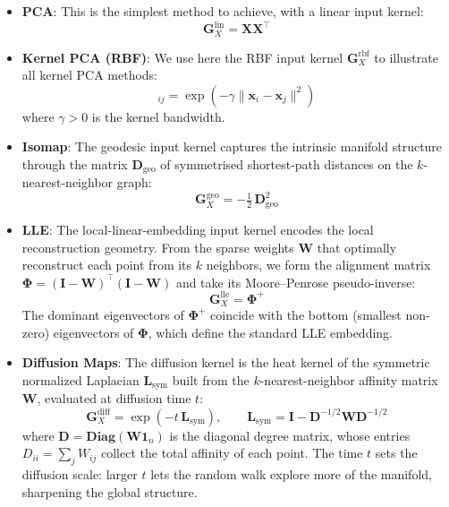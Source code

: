 \documentclass[11pt]{article}
\begin{document}
	\begin{itemize}
		\item \textbf{PCA}: This is the simplest method to achieve, with a linear input kernel:
		\begin{equation}
			\mathbf{G}^\text{lin}_X = \mathbf{X}\mathbf{X}^\top
		\end{equation}
		
		\item \textbf{Kernel PCA (RBF)}: We use here the RBF input kernel $\mathbf{G}^\text{rbf}_X$ to illustrate all kernel PCA methods:
		\begin{equation}
			[\mathbf{G}^\text{rbf}_X]_{ij}=\exp(-\gamma\|\mathbf{x}_i-\mathbf{x}_j\|^2)
		\end{equation}
		where $\gamma>0$ is the kernel bandwidth.
		
		\item \textbf{Isomap}: The geodesic input kernel captures the intrinsic manifold structure through the matrix $\mathbf{D}_\text{geo}$ of symmetrised shortest-path distances on the $k$-nearest-neighbor graph:
		\begin{equation}
			\mathbf{G}^\text{geo}_X = -\tfrac{1}{2}\,\mathbf{D}^2_\text{geo}
		\end{equation}
		
		\item \textbf{LLE}: The local-linear-embedding input kernel encodes the local reconstruction geometry. From the sparse weights $\mathbf{W}$ that optimally reconstruct each point from its $k$ neighbors, we form the alignment matrix $\bm{\Phi}=(\mathbf{I}-\mathbf{W})^\top(\mathbf{I}-\mathbf{W})$ and take its Moore--Penrose pseudo-inverse:
		\begin{equation}
			\mathbf{G}^\text{lle}_X = \bm{\Phi}^{+}
		\end{equation}
		The dominant eigenvectors of $\bm{\Phi}^{+}$ coincide with the bottom (smallest non-zero) eigenvectors of $\bm{\Phi}$, which define the standard LLE embedding.		
		\item \textbf{Diffusion Maps}: The diffusion kernel is the heat kernel of the symmetric normalized Laplacian
		$\mathbf{L}_\text{sym}$ built from the $k$-nearest-neighbor affinity matrix
		$\mathbf{W}$, evaluated at diffusion time $t$:
		\begin{equation}
			\mathbf{G}^\text{diff}_X = \exp(-t\,\mathbf{L}_\text{sym}),
			\qquad
			\mathbf{L}_\text{sym}=\mathbf{I}-\mathbf{D}^{-1/2}\mathbf{W}\mathbf{D}^{-1/2}
		\end{equation}
		where $\mathbf{D}=\textbf{Diag}(\mathbf{W}\mathbf{1}_n)$ is the diagonal degree
		matrix, whose entries $D_{ii}=\sum_j W_{ij}$ collect the total affinity of each
		point. The time $t$ sets the diffusion scale: larger $t$ lets the random walk
		explore more of the manifold, sharpening the global structure.
		

\end{itemize}
\end{document}
